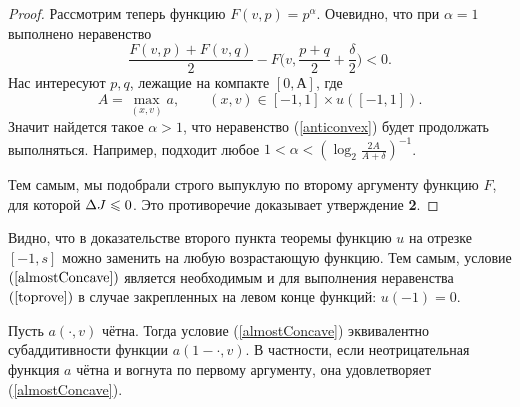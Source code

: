 \begin{proof}
Рассмотрим теперь функцию $F(v, p) = p^\alpha$.
Очевидно, что при $\alpha = 1$ выполнено неравенство
\begin{equation}
\label{anticonvex}
\frac{F(v, p) + F(v, q)}{ 2 } - F\big(v, \frac{p + q}{ 2 } + \frac{\delta}{ 2 }\big) < 0.
\end{equation}
Нас интересуют $p, q$, лежащие на компакте $[0, А]$, где
\begin{equation*}
A = \max \limits_{(x, v)} a, \qquad (x, v) \in [-1, 1 ] \times u([-1, 1] ).
\end{equation*}
Значит найдется такое $\alpha > 1$, что неравенство (\ref{anticonvex}) будет продолжать выполняться.
Например, подходит любое $1 < \alpha < ( \log_2 \frac{2 A}{A + \delta} )^{-1}$.

Тем самым, мы подобрали строго выпуклую по второму аргументу функцию $F$, для которой $\Delta J \leqslant 0$.
Это противоречие доказывает утверждение \textbf{2}.
\end{proof}

\begin{rem}
\label{landesNecessary}
Видно, что в доказательстве второго пункта теоремы
функцию $u$ на отрезке $[-1, s]$ можно заменить на любую возрастающую функцию.
Тем самым, условие $(\ref{almostConcave})$ является необходимым и для выполнения неравенства $(\ref{toprove})$
в случае закрепленных на левом конце функций: $u( -1 ) = 0$.
\end{rem}

\begin{rem}
Пусть $a(\cdot, v)$ чётна.
Тогда условие (\ref{almostConcave}) эквивалентно субаддитивности функции $a(1 - \cdot, v)$.
В частности, если неотрицательная функция $a$ чётна и вогнута по первому аргументу, она удовлетворяет (\ref{almostConcave}).
\end{rem}
